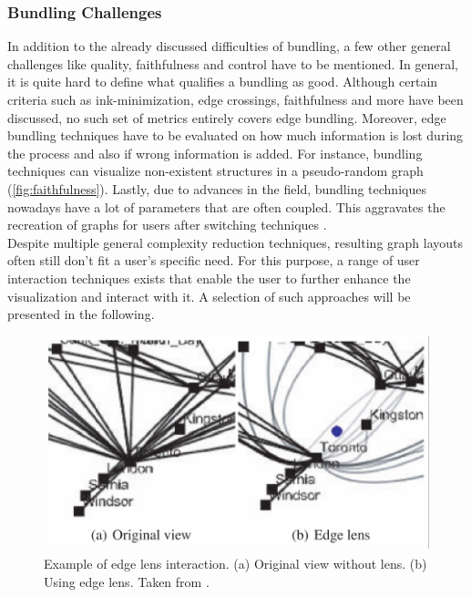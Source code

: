 \subsubsection{Bundling Challenges}
In addition to the already discussed difficulties of bundling, a few other general challenges like quality, faithfulness and control have to be mentioned.
In general, it is quite hard to define what qualifies a bundling as good. Although certain criteria such as ink-minimization, edge crossings, faithfulness and more have been discussed, no such set of metrics entirely covers edge bundling\cite{Lhuillier2017}. 
Moreover, edge bundling techniques have to be evaluated on how much information is lost during the process and also if wrong information is added. For instance, bundling techniques can visualize non-existent structures in a pseudo-random graph (\autoref{fig:faithfulness}).
Lastly, due to advances in the field, bundling techniques nowadays have a lot of parameters that are often coupled. This aggravates the recreation of graphs for users after switching techniques \cite{Lhuillier2017}.\\
Despite multiple general complexity reduction techniques, resulting graph layouts often still don't fit a user's specific need. 
For this purpose, a range of user interaction techniques exists that enable the user to further enhance the visualization and interact with it. A selection of such approaches will be presented in the following. 

\begin{figure}
    \centering
    \includegraphics[scale=0.7]{media/edge_lense.pdf}
    \caption{Example of edge lens interaction. (a) Original view without lens. (b) Using edge lens. Taken from \cite{VonLandesberger2011}.}
    \label{fig:edge_lense}
\end{figure}
